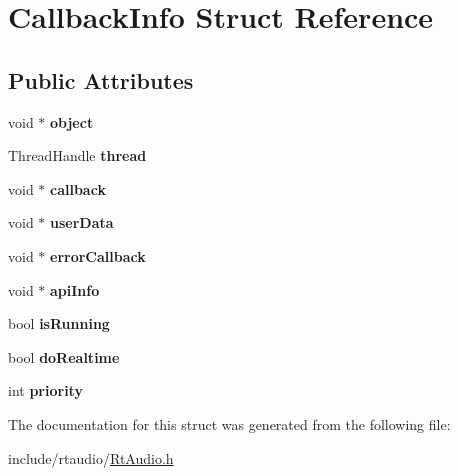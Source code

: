 \hypertarget{struct_callback_info}{}\section{Callback\+Info Struct Reference}
\label{struct_callback_info}
\subsection*{Public Attributes}
\begin{DoxyCompactItemize}
\item 
void $\ast$ {\bfseries object}\hypertarget{struct_callback_info_a89e06f547a26d9b57bec56804c2e2d37}{}\label{struct_callback_info_a89e06f547a26d9b57bec56804c2e2d37}

\item 
Thread\+Handle {\bfseries thread}\hypertarget{struct_callback_info_a45db19fa393c92a55e8f5f725fbaea7d}{}\label{struct_callback_info_a45db19fa393c92a55e8f5f725fbaea7d}

\item 
void $\ast$ {\bfseries callback}\hypertarget{struct_callback_info_a698977fa4fba0e92b2f5c7b30642f5d2}{}\label{struct_callback_info_a698977fa4fba0e92b2f5c7b30642f5d2}

\item 
void $\ast$ {\bfseries user\+Data}\hypertarget{struct_callback_info_a2d45a4cf61c20f400aa606e63685b536}{}\label{struct_callback_info_a2d45a4cf61c20f400aa606e63685b536}

\item 
void $\ast$ {\bfseries error\+Callback}\hypertarget{struct_callback_info_a84e1cd2aae1842b308b4e68bbe5afd38}{}\label{struct_callback_info_a84e1cd2aae1842b308b4e68bbe5afd38}

\item 
void $\ast$ {\bfseries api\+Info}\hypertarget{struct_callback_info_a3528274ab6dee1a780fa052be726eee3}{}\label{struct_callback_info_a3528274ab6dee1a780fa052be726eee3}

\item 
bool {\bfseries is\+Running}\hypertarget{struct_callback_info_a1927838ccc43868018de77ffe7e66341}{}\label{struct_callback_info_a1927838ccc43868018de77ffe7e66341}

\item 
bool {\bfseries do\+Realtime}\hypertarget{struct_callback_info_ae8cdf8eb8dc5cf4e2e330455cc400614}{}\label{struct_callback_info_ae8cdf8eb8dc5cf4e2e330455cc400614}

\item 
int {\bfseries priority}\hypertarget{struct_callback_info_aaad5c346c8fac1b7cfc9754977654607}{}\label{struct_callback_info_aaad5c346c8fac1b7cfc9754977654607}

\end{DoxyCompactItemize}


The documentation for this struct was generated from the following file\+:\begin{DoxyCompactItemize}
\item 
include/rtaudio/\hyperlink{_rt_audio_8h}{Rt\+Audio.\+h}\end{DoxyCompactItemize}

